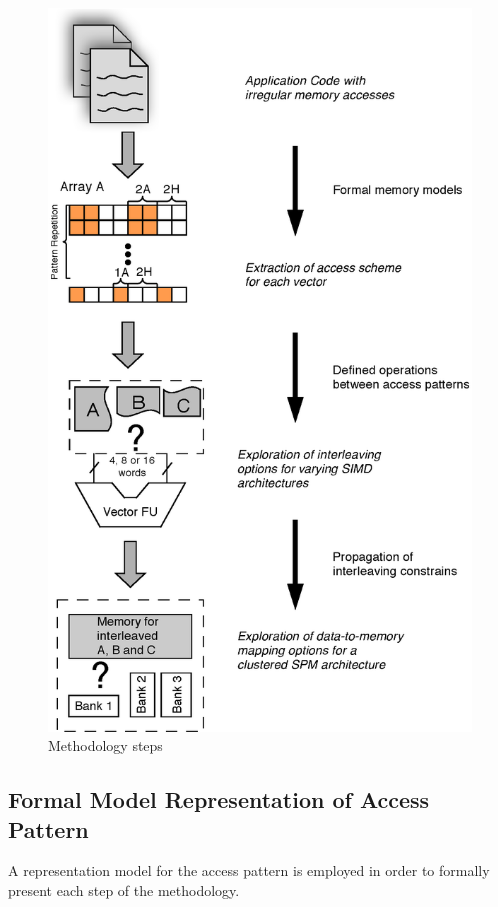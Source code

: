 \documentclass[prodmode,acmtodaes]{acmsmall}
\begin{document}
\begin{figure}
\centering
	\label{workflow}
	\caption{Methodology steps}
	\includegraphics[scale = 0.5]{Images/Workflow.eps} 
\end{figure}

\subsection{Formal Model Representation of Access Pattern }

A representation model for the access pattern is employed in order to formally present each step of the methodology.
\end{document}
